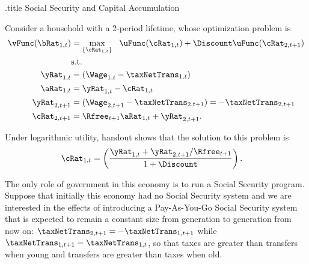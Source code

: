 \documentclass{handout}
\begin{document}
\handoutHeader

\begin{verbatimwrite}{\jobname.title}
Social Security and Capital Accumulation
\end{verbatimwrite}

\handoutNameMake


Consider a household with a 2-period lifetime, whose optimization 
problem is
\begin{equation}\begin{gathered}\begin{aligned}
        \vFunc(\bRat_{1,t}) & =  \max_{\{\cRat_{1,t}\}} ~~ \uFunc(\cRat_{1,t}) + \Discount \uFunc(\cRat_{2,t+1})  \\
         & \mbox{s.t.}    \nonumber 
\\      \yRat_{1,t} & =  (\Wage_{1,t}-\taxNetTrans_{1,t})
\\      \aRat_{1,t} & =  \yRat_{1,t} - \cRat_{1,t}
\\  \yRat_{2,t+1} & =  (\Wage_{2,t+1}-\taxNetTrans_{2,t+1}) = -\taxNetTrans_{2,t+1}
\\  \cRat_{2,t+1} & =  \Rfree_{t+1} \aRat_{1,t}+\yRat_{2,t+1}
.
\end{aligned}\end{gathered}\end{equation}

Under logarithmic utility, handout  shows that the solution to this problem is
\begin{equation}\begin{gathered}\begin{aligned}
        \cRat_{1,t} & =  \left(\frac{\yRat_{1,t}+\yRat_{2,t+1}/\Rfree_{t+1}}{1+\Discount}\right).  \label{eq:c1} 
\end{aligned}\end{gathered}\end{equation}

The only role of government in this economy is to run a Social
Security program.  Suppose that initially this economy
had no Social Security system and we are interested in the effects of
introducing a Pay-As-You-Go Social Security system that is expected to
remain a constant size from generation to generation from now on:
$\taxNetTrans_{2,t+1} = -\taxNetTrans_{1,t+1}$ while $\taxNetTrans_{1,t+1} =
\taxNetTrans_{1,t}$, so that taxes are greater than transfers when young
and transfers are greater than taxes when old.
\end{document}
